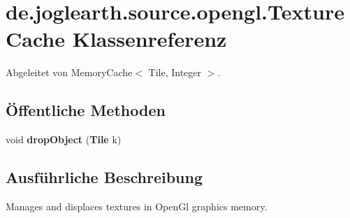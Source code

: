 \section{de.\-joglearth.\-source.\-opengl.\-Texture\-Cache Klassenreferenz}
\label{classde_1_1joglearth_1_1source_1_1opengl_1_1_texture_cache}


Abgeleitet von Memory\-Cache$<$ Tile, Integer $>$.

\subsection*{Öffentliche Methoden}
\begin{DoxyCompactItemize}
\item 
void {\bfseries drop\-Object} ({\bf Tile} k)\label{classde_1_1joglearth_1_1source_1_1opengl_1_1_texture_cache_af78af343a17ade633613f278d1e16c26}

\end{DoxyCompactItemize}


\subsection{Ausführliche Beschreibung}
Manages and displaces textures in Open\-Gl graphics memory. 